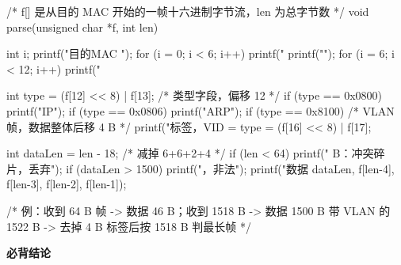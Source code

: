 \documentclass[10pt,a4paper]{ctexart}
\begin{document}
\begin{codebox}
/* f[] 是从目的 MAC 开始的一帧十六进制字节流，len 为总字节数 */
void parse(unsigned char *f, int len) {
    int i;
    printf("目的MAC ");  for (i = 0; i < 6; i++)  printf("%
    printf("  "); for (i = 6; i < 12; i++) printf("%

    int type = (f[12] << 8) | f[13];      /* 类型字段，偏移 12 */
    if (type == 0x0800) printf(" IP\n");
    if (type == 0x0806) printf(" ARP\n");
    if (type == 0x8100) {                 /* VLAN 帧，数据整体后移 4 B */
        printf("\nVLAN 标签，VID = %
        type = (f[16] << 8) | f[17];
    }

    int dataLen = len - 18;               /* 减掉 6+6+2+4 */
    if (len < 64)         printf(" B：冲突碎片，丢弃\n");
    if (dataLen > 1500)   printf("，非法\n");
    printf("数据 %
           dataLen, f[len-4], f[len-3], f[len-2], f[len-1]);
}

/* 例：收到 64 B 帧 -> 数据 46 B；收到 1518 B -> 数据 1500 B
      带 VLAN 的 1522 B -> 去掉 4 B 标签后按 1518 B 判最长帧 */
\end{codebox}




\textbf{必背结论}
\end{document}
